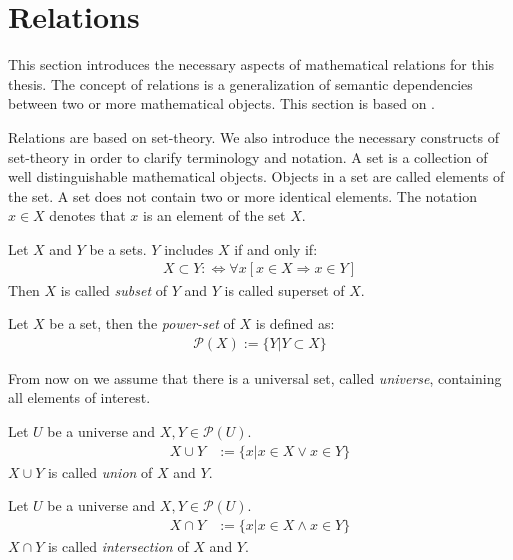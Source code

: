 \section{Relations}
This section introduces the necessary aspects of mathematical relations for this thesis.
The concept of relations is a generalization of semantic dependencies between two or more mathematical objects.
This section is based on \cite{DBLP:books/sp/SchmidtS89}.

Relations are based on set-theory. We also introduce the necessary constructs of set-theory in order to clarify terminology and notation.
A set is a collection of well distinguishable mathematical objects.
Objects in a set are called elements of the set.
A set does not contain two or more identical elements.
The notation $x \in X$ denotes that $x$ is an element of the set $X$.

\begin{definition}[Inclusion]
\label{definition:Inclusion}
Let $X$ and $Y$ be a sets.
$Y$ includes $X$ if and only if:
\begin{align}
X \subset Y :\Leftrightarrow \forall x [x \in X \Rightarrow x \in Y]
\end{align}
Then $X$ is called \emph{subset} of $Y$ and $Y$ is called superset of $X$.
\end{definition}

\begin{definition}
\label{definition:PowerSet}
Let $X$ be a set, then the \emph{power-set} of $X$ is defined as:
\begin{align}
\mathcal{P}(X) := \{ Y | Y \subset X \}
\end{align}
\end{definition}

From now on we assume that there is a universal set, called \emph{universe}, containing all elements of interest.

\begin{definition}[Union]
Let $U$ be a universe and $X,Y \in \mathcal{P}(U)$.
\begin{align}
X \cup Y &:= \{ x | x \in X \vee x \in Y \} 
\end{align}
$X \cup Y$ is called \emph{union} of $X$ and $Y$.
\end{definition}

\begin{definition}[Intersection]
Let $U$ be a universe and $X,Y \in \mathcal{P}(U)$.
\begin{align}
X \cap Y &:= \{ x | x \in X \wedge x \in Y \} 
\end{align}
$X \cap Y$ is called \emph{intersection} of $X$ and $Y$.
\end{definition}

